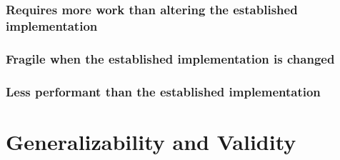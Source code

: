 \subsubsection{Requires more work than altering the established
  implementation}

\subsubsection{Fragile when the established implementation is changed}

\subsubsection{Less performant than the established implementation}

\section{Generalizability and Validity}

%
%
